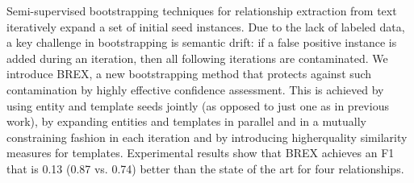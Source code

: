 Semi-supervised bootstrapping techniques for relationship extraction from text iteratively expand a set of initial seed instances. Due to the lack of labeled data, a key challenge in bootstrapping is semantic drift: if a false positive instance is added during an iteration, then all following iterations are contaminated. We introduce BREX, a new bootstrapping method that protects against such contamination by highly effective confidence assessment. This is achieved by using entity and template seeds jointly (as opposed to just one as in previous work), by expanding entities and templates in parallel and in a mutually constraining fashion in each iteration and by introducing higherquality similarity measures for templates. Experimental results show that BREX achieves an F1 that is 0.13 (0.87 vs. 0.74) better than the state of the art for four relationships.
